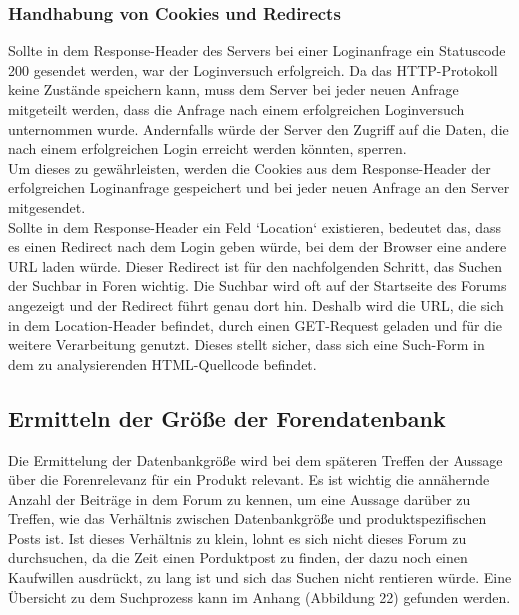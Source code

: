 \subsubsection{Handhabung von Cookies und Redirects}
Sollte in dem Response-Header des Servers bei einer Loginanfrage ein Statuscode 200 gesendet werden, war der Loginversuch erfolgreich. Da das HTTP-Protokoll keine Zustände speichern kann, muss dem Server bei jeder neuen Anfrage mitgeteilt werden, dass die Anfrage nach einem erfolgreichen Loginversuch unternommen wurde. Andernfalls würde der Server den Zugriff auf die Daten, die nach einem erfolgreichen Login erreicht werden könnten, sperren.\\
Um dieses zu gewährleisten, werden die Cookies aus dem Response-Header der erfolgreichen Loginanfrage gespeichert und bei jeder neuen Anfrage an den Server mitgesendet.\\
Sollte in dem Response-Header ein Feld `Location` existieren, bedeutet das, dass es einen Redirect nach dem Login geben würde, bei dem der Browser eine andere URL laden würde. Dieser Redirect ist für den nachfolgenden Schritt, das Suchen der Suchbar in Foren wichtig. Die Suchbar wird oft auf der Startseite des Forums angezeigt und der Redirect führt genau dort hin. Deshalb wird die URL, die sich in dem Location-Header befindet, durch einen GET-Request geladen und für die weitere Verarbeitung genutzt. Dieses stellt sicher, dass sich eine Such-Form in dem zu analysierenden HTML-Quellcode befindet.


\subsection{Ermitteln der Größe der Forendatenbank}
Die Ermittelung der Datenbankgröße wird bei dem späteren Treffen der Aussage über die Forenrelevanz für ein Produkt relevant.
Es ist wichtig die annähernde Anzahl der Beiträge in dem Forum zu kennen, um eine Aussage darüber zu Treffen, wie das Verhältnis zwischen Datenbankgröße und produktspezifischen Posts ist. Ist dieses Verhältnis zu klein, lohnt es sich nicht dieses Forum zu durchsuchen, da die Zeit einen Porduktpost zu finden, der dazu noch einen Kaufwillen ausdrückt, zu lang ist und sich das Suchen nicht rentieren würde.
Eine Übersicht zu dem Suchprozess kann im Anhang (Abbildung 22) gefunden werden.
